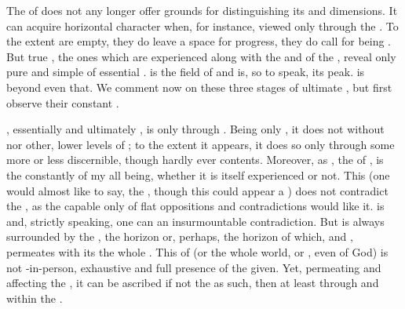 \label{sub:SelfOne}
%
\pa The  of  does not any longer offer grounds
for distinguishing its  and  dimensions.  It can
acquire horizontal character when, for instance, viewed only through the
.  To the extent  are {empty}, they
do leave a space for progress, they do call for being .  But true
, the ones which are experienced along with the  and
 of the \oss, reveal only pure and simple  of
essential .   is the field of  and
 is, so to speak, its peak.  is beyond even that.  We comment
now on these three stages of ultimate , but first observe
their constant .

, essentially and ultimately , is  only
through .  Being only , it does not 
without  nor other, lower levels of ; to the extent it
appears, it does so only through some more or less discernible, though hardly
ever  contents.  Moreover, as , the 
 of ,  is the constantly  
of my all being, whether it is itself experienced or not.  This 
(one would almost like to say, the , though this
could appear a ) does not contradict the
, as the  capable only of flat
oppositions and contradictions would like it.  is 
and, strictly speaking, one can  an insurmountable contradiction. But
 is always surrounded by the , the  horizon
or, perhaps, the horizon of  which,  and
, permeates with its  the whole .
This  of  (or the whole world, or , even of
God) is not -in-person, exhaustive and full presence of the given.
Yet, permeating and affecting the , it can be ascribed if not the
 as such, then at least  through and within the
.

